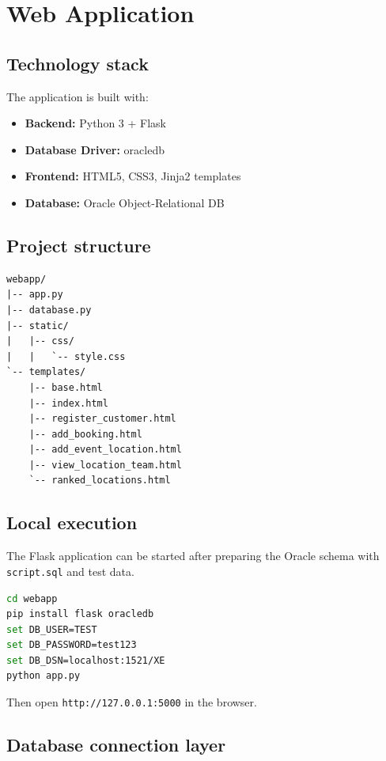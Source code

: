 \chapter{Web Application}
\section{Technology stack}

The application is built with:

\begin{itemize}
    \item \textbf{Backend:} Python 3 + Flask
    \item \textbf{Database Driver:} oracledb
    \item \textbf{Frontend:} HTML5, CSS3, Jinja2 templates
    \item \textbf{Database:} Oracle Object-Relational DB
\end{itemize}

\section{Project structure}

\begin{verbatim}
webapp/
|-- app.py
|-- database.py
|-- static/
|   |-- css/
|   |   `-- style.css
`-- templates/
    |-- base.html
    |-- index.html
    |-- register_customer.html
    |-- add_booking.html
    |-- add_event_location.html
    |-- view_location_team.html
    `-- ranked_locations.html
\end{verbatim}

\section{Local execution}

The Flask application can be started after preparing the Oracle schema with
\texttt{script.sql} and test data.

\begin{lstlisting}[language=bash]
cd webapp
pip install flask oracledb
set DB_USER=TEST
set DB_PASSWORD=test123
set DB_DSN=localhost:1521/XE
python app.py
\end{lstlisting}

Then open \texttt{http://127.0.0.1:5000} in the browser.

\section{Database connection layer}

